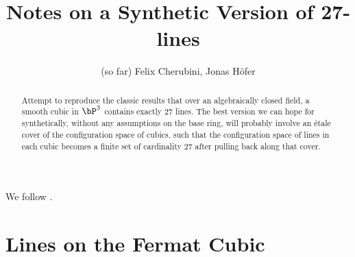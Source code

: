 \documentclass{../util/zariski-small}
\title{Notes on a Synthetic Version of 27-lines}
\begin{document}
\author{(so far) Felix Cherubini, Jonas Höfer}

\maketitle

\begin{abstract}
  Attempt to reproduce the classic results that over an algebraically closed field,
  a smooth cubic in $\bP^3$ contains exactly 27 lines.
  The best version we can hope for synthetically, without any assumptions on the base ring,
  will probably involve an étale cover of the configuration space of cubics, such that the configuration space of lines in each cubic becomes a finite set of cardinality 27 after pulling back along that cover.
\end{abstract}

We follow \cite[Chapter 27]{vakil}.

\section{Lines on the Fermat Cubic}


\printbibliography
\end{document}

